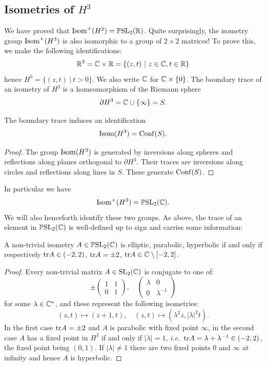 \subsection{Isometries of $H^3$}
We have proved that ${\rm Isom}^+(H^2) = \mathbb{P}{\rm SL}_2(\mathbb{R})$. Quite surprisingly, the isometry group ${\rm Isom}^+(H^3)$ is also isomorphic to a group of $2\times 2$ matrices! To prove this, we make the following identifications:
$$\matR^3 = \matC \times \matR = \{(z,t)\ |\ z\in\matC, t\in\matR\}$$
hence $H^3 = \{(z,t)\ |\ t >0\}$.
We also write $\mathbb{C}$ for $\mathbb{C} \times \{0\}$. The boundary trace of an isometry of $H^3$ is a homeomorphism of the Riemann sphere
$$\partial H^3 = \mathbb{C} \cup\{\infty\} = S.$$
\begin{prop} \label{H3:prop}
The boundary trace induces an identification
$${\rm Isom}(H^3) = {\rm Conf}(S).$$
\end{prop}
\begin{proof}
The group ${\rm Isom}(H^3)$ is generated by inversions along spheres and reflections along planes orthogonal to $\partial H^3$. Their traces are inversions along circles and reflections along lines in $S$. These generate ${\rm Conf}(S)$.
\end{proof}
In particular we have
$$ {\rm Isom}^+(H^3) = \mathbb{P}{\rm SL}_2(\mathbb{C}).$$
We will also henceforth identify these two groups. As above, the trace of an element in $\mathbb{P}{\rm SL}_2(\mathbb{C})$ is well-defined up to sign and carries some information:
\begin{prop}
A non-trivial isometry $A\in \mathbb{P}{\rm SL}_2(\mathbb{C})$ is elliptic, parabolic, hyperbolic if and only if respectively ${\rm tr} A\in (-2,2)$, ${\rm tr} A=\pm 2$, ${\rm tr} A\in\mathbb{C} \setminus [-2,2]$.
\end{prop}
\begin{proof}
Every non-trivial matrix $A\in{\rm SL}_2(\mathbb{C})$ is conjugate to one of:
$$\pm\begin{pmatrix} 1 & 1 \\ 0 & 1 \end{pmatrix}, \quad 
\begin{pmatrix} \lambda & 0 \\ 0 & \lambda^{-1} \end{pmatrix} $$
for some $\lambda \in \mathbb{C}^*$, and these represent the following isometries:
$$(z,t) \longmapsto (z + 1,t), \quad (z,t) \longmapsto (\lambda^2 z, |\lambda|^2 t).$$
In the first case ${\rm tr} A = \pm 2$ and $A$ is parabolic with fixed point $\infty$, in the second case $A$ has a fixed point in $H^3$ if and only if $|\lambda|=1$, \emph{i.e.}~${\rm tr} A = \lambda + \lambda^{-1}\in (-2,2)$, the fixed point being $(0,1)$. If $|\lambda|\neq 1$ there are two fixed points $0$ and $\infty$ at infinity and hence $A$ is hyperbolic.
\end{proof}

